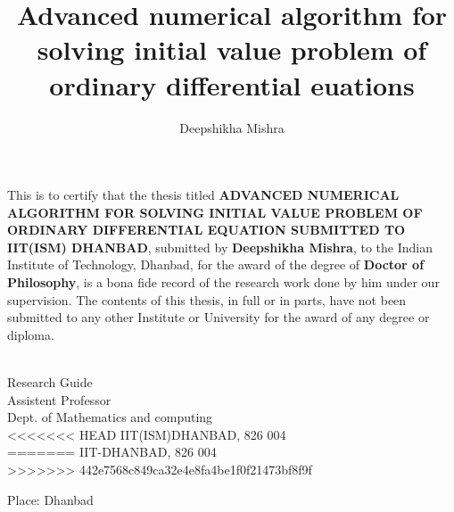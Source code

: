 \documentclass[PhD]{iitmdiss} %
\begin{document}

\title{Advanced numerical algorithm for solving initial value problem of ordinary differential euations}

\author{Deepshikha Mishra}

\date{}


\maketitle
\certificate

\vspace*{0.5in}

\noindent This is to certify that the thesis titled {\bf ADVANCED NUMERICAL ALGORITHM FOR SOLVING INITIAL VALUE PROBLEM OF ORDINARY DIFFERENTIAL EQUATION SUBMITTED TO IIT(ISM) DHANBAD}, submitted by {\bf Deepshikha Mishra}, 
  to the Indian Institute of Technology, Dhanbad, for
the award of the degree of {\bf Doctor of Philosophy}, is a bona fide
record of the research work done by him under our supervision.  The
contents of this thesis, in full or in parts, have not been submitted
to any other Institute or University for the award of any degree or
diploma.

\vspace*{1.5in}

\begin{singlespacing}
\hspace*{-0.25in}
\parbox{2.5in}{
 \\
\noindent Research Guide \\ 
\noindent Assistent Professor \\
\noindent Dept. of Mathematics and computing\\
<<<<<<< HEAD
\noindent IIT(ISM)DHANBAD, 826 004 \\
=======
\noindent IIT-DHANBAD, 826 004 \\ %
>>>>>>> 442e7568c849ca32e4e8fa4be1f0f21473bf8f9f
} 
\hspace*{1.0in} 
\end{singlespacing}
\vspace*{0.25in}
\noindent Place: Dhanbad
\end{document}
